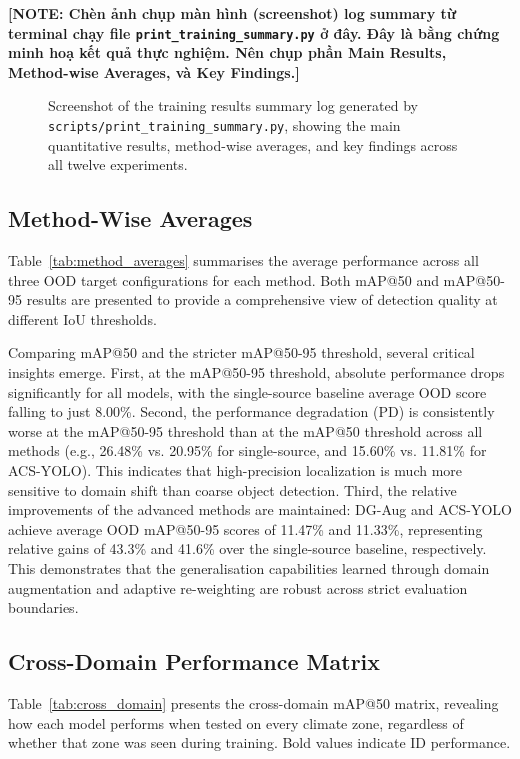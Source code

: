 \documentclass[12pt,a4paper]{article}
\newcommand{\note}[1]{{\color{warningred}\bfseries [NOTE: #1]}}
\begin{document}
\note{Chèn ảnh chụp màn hình (screenshot) log summary từ terminal chạy file \texttt{print\_training\_summary.py} ở đây. Đây là bằng chứng minh hoạ kết quả thực nghiệm. Nên chụp phần Main Results, Method-wise Averages, và Key Findings.}

\begin{figure}[H]
\centering
\caption{Screenshot of the training results summary log generated by \texttt{scripts/print\_training\_summary.py}, showing the main quantitative results, method-wise averages, and key findings across all twelve experiments.}
\label{fig:training_logs}
\end{figure}


\subsection{Method-Wise Averages}

Table~\ref{tab:method_averages} summarises the average performance across all three OOD target configurations for each method. Both mAP@50 and mAP@50-95 results are presented to provide a comprehensive view of detection quality at different IoU thresholds.

Comparing mAP@50 and the stricter mAP@50-95 threshold, several critical insights emerge. First, at the mAP@50-95 threshold, absolute performance drops significantly for all models, with the single-source baseline average OOD score falling to just 8.00\%. Second, the performance degradation (PD) is consistently worse at the mAP@50-95 threshold than at the mAP@50 threshold across all methods (e.g., 26.48\% vs. 20.95\% for single-source, and 15.60\% vs. 11.81\% for ACS-YOLO). This indicates that high-precision localization is much more sensitive to domain shift than coarse object detection. Third, the relative improvements of the advanced methods are maintained: DG-Aug and ACS-YOLO achieve average OOD mAP@50-95 scores of 11.47\% and 11.33\%, representing relative gains of 43.3\% and 41.6\% over the single-source baseline, respectively. This demonstrates that the generalisation capabilities learned through domain augmentation and adaptive re-weighting are robust across strict evaluation boundaries.

\subsection{Cross-Domain Performance Matrix}

Table~\ref{tab:cross_domain} presents the cross-domain mAP@50 matrix, revealing how each model performs when tested on every climate zone, regardless of whether that zone was seen during training. Bold values indicate ID performance.
\end{document}
